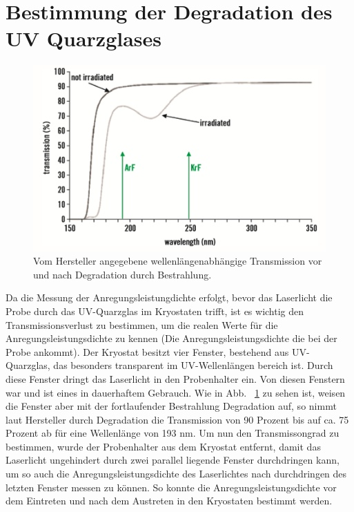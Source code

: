 
\thispagestyle{fancy}

\section{Bestimmung der Degradation des UV Quarzglases}
%
\begin{figure}[htb]
  \centering
  \begin{minipage}[t]{0.49\linewidth}
      \centering
      \includegraphics[width=\linewidth]{Bilder/uvsilicaDegradation.png}
      \caption{Vom Hersteller angegebene wellenlängenabhängige Transmission vor und nach Degradation durch Bestrahlung.}
      \label{fig:degra}
  \end{minipage}
\end{figure}
\noindent
Da die Messung der Anregungsleistungdichte erfolgt, bevor das Laserlicht die Probe durch das UV-Quarzglas im Kryostaten trifft, ist es wichtig den Transmissionsverlust zu bestimmen, um die realen Werte für die Anregungsleistungsdichte zu kennen (Die Anregungsleistungsdichte die bei der Probe ankommt). Der Kryostat besitzt vier Fenster, bestehend aus UV-Quarzglas, das besonders transparent im UV-Wellenlängen bereich ist. Durch diese Fenster dringt das Laserlicht in den Probenhalter ein. Von diesen Fenstern war und ist eines in dauerhaftem Gebrauch. Wie in Abb. ~\ref{fig:degra} zu sehen ist, weisen die Fenster aber mit der fortlaufender Bestrahlung Degradation auf, so nimmt laut Hersteller durch Degradation die Transmission von 90 Prozent bis auf ca. 75 Prozent ab für eine Wellenlänge von 193 nm.
Um nun den Transmissongrad zu bestimmen, wurde der Probenhalter aus dem Kryostat entfernt, damit das Laserlicht ungehindert durch zwei parallel liegende Fenster durchdringen kann, um so auch die Anregungsleistungsdichte des Laserlichtes nach durchdringen des letzten Fenster messen zu können. So konnte die Anregungsleistungsdichte vor dem Eintreten und nach dem Austreten in den Kryostaten bestimmt werden. 
